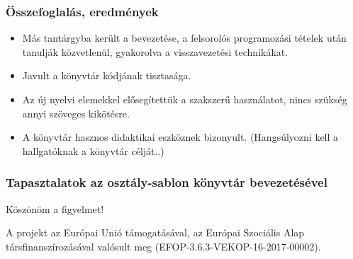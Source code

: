 \documentclass[11pt]{beamer}
\begin{document}
\begin{frame}
	\frametitle{Összefoglalás, eredmények}
	\begin{itemize}
		\item Más tantárgyba került a bevezetése, a felsorolós programozási tételek után tanulják közvetlenül, gyakorolva a visszavezetési technikákat.
		\item Javult a könyvtár kódjának tisztasága.
		\item Az új nyelvi elemekkel elősegítettük a szakszerű használatot, nincs szükség annyi szöveges kikötésre.
		\item A könyvtár hasznos didaktikai eszköznek bizonyult. (Hangsúlyozni kell a hallgatóknak a könyvtár célját..)
	\end{itemize}
\end{frame}

\begin{frame}
	\frametitle{Tapasztalatok az osztály-sablon könyvtár bevezetésével}
	\begin{center}
		\Large{Köszönöm a figyelmet!}
	
	\vspace*{25px}
	{\small A projekt az Európai Unió támogatásával, az Európai Szociális Alap társfinanszírozásával valósult meg (EFOP-3.6.3-VEKOP-16-2017-00002).}\end{center}
\end{frame}
\end{document}
